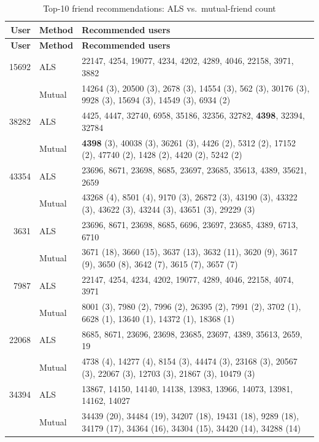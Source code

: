 \documentclass[11pt]{article}
\begin{document}
{\small
  \begin{longtable}{|r|l|p{}|}
    \caption{Top-10 friend recommendations: ALS vs.\ mutual-friend
    count}\label{tab:friend-recs} \\
    \hline
    \textbf{User} & \textbf{Method} & \textbf{Recommended users} \\ \hline
    \endfirsthead
    \hline
    \textbf{User} & \textbf{Method} & \textbf{Recommended users} \\ \hline
    \endhead
    15692 & ALS & 22147, 4254, 19077, 4234, 4202, 4289, 4046, 22158,
    3971, 3882 \\
    & Mutual & 14264 (3), 20500 (3), 2678 (3), 14554 (3), 562 (3),
    30176 (3), 9928 (3), 15694 (3), 14549 (3), 6934 (2) \\ \hline
    38282 & ALS & 4425, 4447, 32740, 6958, 35186, 32356, 32782,
    \textbf{4398}, 32394, 32784 \\
    & Mutual & \textbf{4398} (3), 40038 (3), 36261 (3), 4426 (2),
    5312 (2), 17152 (2), 47740 (2), 1428 (2), 4420 (2), 5242 (2) \\ \hline
    43354 & ALS & 23696, 8671, 23698, 8685, 23697, 23685, 35613,
    4389, 35621, 2659 \\
    & Mutual & 43268 (4), 8501 (4), 9170 (3), 26872 (3), 43190 (3),
    43322 (3), 43622 (3), 43244 (3), 43651 (3), 29229 (3) \\ \hline
    3631 & ALS & 23696, 8671, 23698, 8685, 6696, 23697, 23685, 4389,
    6713, 6710 \\
    & Mutual & 3671 (18), 3660 (15), 3637 (13), 3632 (11), 3620 (9),
    3617 (9), 3650 (8), 3642 (7), 3615 (7), 3657 (7) \\ \hline
    7987 & ALS & 22147, 4254, 4234, 4202, 19077, 4289, 4046, 22158,
    4074, 3971 \\
    & Mutual & 8001 (3), 7980 (2), 7996 (2), 26395 (2), 7991 (2),
    3702 (1), 6628 (1), 13640 (1), 14372 (1), 18368 (1) \\ \hline
    22068 & ALS & 8685, 8671, 23696, 23698, 23685, 23697, 4389,
    35613, 2659, 19 \\
    & Mutual & 4738 (4), 14277 (4), 8154 (3), 44474 (3), 23168 (3),
    20567 (3), 22067 (3), 12703 (3), 21867 (3), 10479 (3) \\ \hline
    34394 & ALS & 13867, 14150, 14140, 14138, 13983, 13966, 14073,
    13981, 14162, 14027 \\
    & Mutual & 34439 (20), 34484 (19), 34207 (18), 19431 (18), 9289
    (18), 34179 (17), 34364 (16), 34304 (15), 34420 (14), 34288 (14) \\ \hline

\end{longtable}}
\end{document}
